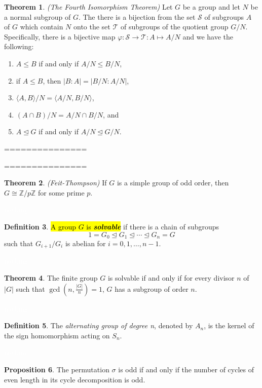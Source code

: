 \documentclass{article}
\theoremstyle{definition}
\newtheorem{thm}{Theorem}[section]
\newtheorem{prop}[thm]{Proposition}
\newtheorem{defn}[thm]{Definition}
\newcommand{\nl}{\textcolor{white}{nothing}}
\newcommand{\ra}{\rightarrow}
\newcommand{\lp}{\left(}
\newcommand{\rp}{\right)}
\newcommand{\Z}{\mathbb{Z}}
\newcommand{\vphi}{\varphi}
\newcommand{\CS}{\mathcal{S}}
\begin{document}
\begin{thm}\textit{(The Fourth Isomorphism Theorem)}
Let $G$ be a group and let $N$ be a normal subgroup of $G$. The there is a bijection from the set $\CS$ of subgroups $A$ of $G$ which contain $N$ onto the set $\mathcal{T}$ of subgroups of the quotient group $G/N$. Specifically, there is a bijective map $\vphi:\CS \ra \mathcal{T}:A\mapsto A/N$ and we have the following:
\begin{enumerate}
\item $A\leq B$ if and only if $A/N\leq B/N$,
\item if $A\leq B$, then $|B:A| = |B/N:A/N|$,
\item $\langle A, B\rangle/N = \langle A/N, B/N\rangle$,
\item $(A\cap B)/N = A/N\cap B/N$, and 
\item $A\unlhd G$ if and only if $A/N \unlhd G/N$.
\end{enumerate}
\end{thm}


===============

===============

\begin{thm}\textit{(Feit-Thompson)}
If $G$ is a simple group of odd order, then $G\cong\Z/p\Z$ for some prime $p$.
\end{thm}

\nl

\begin{defn}
\hl{A group $G$ is \textbf{\textit{solvable}}} if there is a chain of subgroups 
\[1 = G_0\unlhd G_1\unlhd\cdots\unlhd G_n = G\]
such that $G_{i+1}/G_i$ is abelian for $i= 0,1,\ldots,n-1$.
\end{defn}

\nl

\begin{thm}
The finite group $G$ is solvable if and only if for every divisor $n$ of $|G|$ such that $\gcd\lp n,\frac{|G|}{n}\rp = 1$, $G$ has a subgroup of order $n$.
\end{thm}

\nl

\begin{defn}
The \textit{alternating group of degree n}, denoted by $A_n$, is the kernel of the sign homomorphism acting on $S_n$.
\end{defn}

\nl

\begin{prop}
The permutation $\sigma$ is odd if and only if the number of cycles of even length in its cycle decomposition is odd.
\end{prop}
\end{document}
